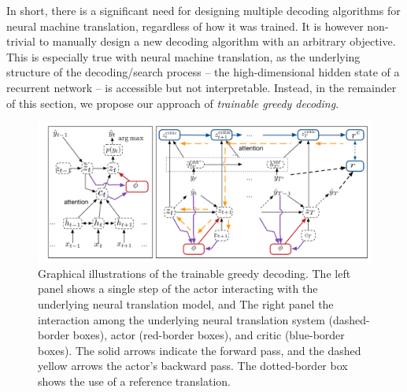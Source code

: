 In short, there is a significant need for designing multiple decoding algorithms for neural machine translation, regardless of how it was trained. It is however non-trivial to manually design a new decoding algorithm with an arbitrary objective. This is especially true with neural machine translation, as the underlying structure of the decoding/search process -- the high-dimensional hidden state of a recurrent network -- is accessible but not interpretable. Instead, in the remainder of this section, we propose our approach of {\it trainable greedy decoding}.

\begin{figure}[t]
\centering
\begin{minipage}{\textwidth}
\includegraphics[width=\columnwidth]{figs/trainable/framework.pdf}
\vspace{-4mm}
\caption{\label{fig:tgd}  
Graphical illustrations of the trainable greedy decoding. The left panel shows a single step of the actor interacting with the underlying neural translation model, and The right panel the interaction among the underlying neural translation system (dashed-border boxes), actor (red-border boxes), and critic (blue-border boxes). The solid arrows indicate the forward pass, and the dashed yellow arrows the actor's backward pass. The dotted-border box shows the use of a reference translation.}
\end{minipage}
\vspace{-1mm}
\end{figure}

